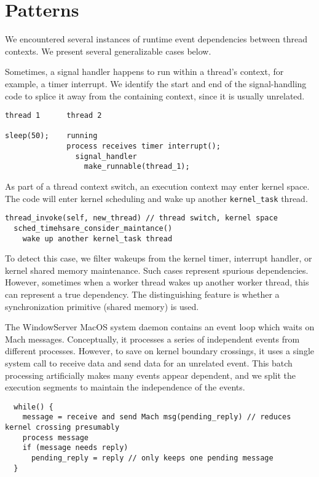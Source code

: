 \section{Patterns}

We encountered several instances of runtime event dependencies between thread
contexts. We present several generalizable cases below.

Sometimes, a signal handler happens to run within a thread's context, for
example, a timer interrupt. We identify the start and end of the
signal-handling code to splice it away from the containing context, since it is
usually unrelated.

\begin{verbatim}
thread 1      thread 2

sleep(50);    running
              process receives timer interrupt();
                signal_handler
                  make_runnable(thread_1);
\end{verbatim}

As part of a thread context switch, an execution context may enter kernel
space. The code will enter kernel scheduling and wake up another
\texttt{kernel\_task} thread.

\begin{verbatim}
thread_invoke(self, new_thread) // thread switch, kernel space
  sched_timehsare_consider_maintance()
    wake up another kernel_task thread
\end{verbatim}

To detect this case, we filter wakeups from the kernel timer, interrupt
handler, or kernel shared memory maintenance. Such cases represent spurious
dependencies. However, sometimes when a worker thread wakes up another worker
thread, this can represent a true dependency. The distinguishing feature is
whether a synchronization primitive (shared memory) is used.

The WindowServer MacOS system daemon contains an event loop which waits on Mach
messages. Conceptually, it processes a series of independent events from
different processes. However, to save on kernel boundary crossings, it uses a
single system call to receive data and send data for an unrelated event. This
batch processing artificially makes many events appear dependent, and we split
the execution segments to maintain the independence of the events.

\begin{verbatim}
  while() {
    message = receive and send Mach msg(pending_reply) // reduces
kernel crossing presumably
    process message
    if (message needs reply)
      pending_reply = reply // only keeps one pending message
  }
\end{verbatim}

